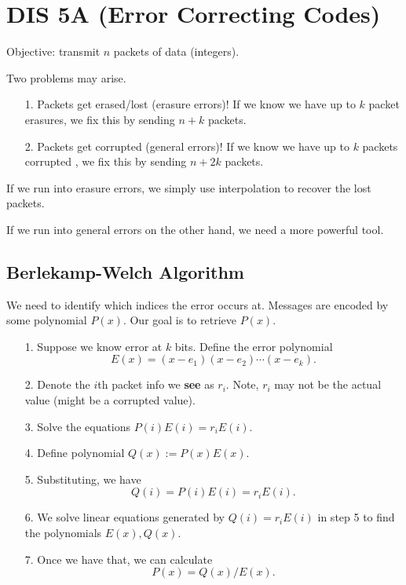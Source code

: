 \section{DIS 5A (Error Correcting Codes)}

Objective: transmit $n$ packets of data (integers). 

Two problems may arise. 

\begin{itemize}
    \item[1.] Packets get erased/lost (erasure errors)! If we know we have up to $k$ packet erasures, we fix this by sending $n+k$ packets. 
    \item[2.] Packets get corrupted (general errors)! If we know we have up to $k$ packets corrupted , we fix this by sending $n+2k$ packets. 
\end{itemize}

If we run into erasure errors, we simply use interpolation to recover the lost packets. 

If we run into general errors on the other hand, we need a more powerful tool. 

\subsection{Berlekamp-Welch Algorithm}
We need to identify which indices the error occurs at. Messages are encoded by some polynomial $P(x)$. Our goal is to retrieve $P(x)$. 
\begin{itemize}
    \item[1.] Suppose we know error at $k$ bits. Define the error polynomial \[ E(x) = (x-e_1)(x-e_2)\cdots(x-e_k). \]
    \item[2.] Denote the $i$th packet info we \textbf{see} as $r_i$. Note, $r_i$ may not be the actual value (might be a corrupted value). 
    \item[3.] Solve the equations $P(i)E(i) = r_i E(i)$. 
    \item[4.] Define polynomial $Q(x) := P(x)E(x)$. 
    \item[5.] Substituting, we have \[Q(i) =  P(i) E(i) = r_i E(i). \] 
    \item[6.] We solve linear equations generated by $Q(i) = r_i E(i)$ in step 5 to find the polynomials $E(x), Q(x)$. 
    \item[7.] Once we have that, we can calculate \[ P(x) = Q(x) / E(x). \] 
\end{itemize}
